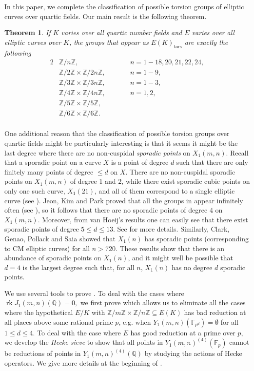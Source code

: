 \documentclass[11pt,reqno]{amsart}
\DeclareMathOperator{\rk}{rk}
\newtheorem{theorem}{Theorem}[section]
\theoremstyle{definition}
\numberwithin{equation}{section}
\newcommand{\Q}{\mathbb{Q}}
\newcommand{\F}{\mathbb{F}}
\newcommand{\tor}{\mathrm{tors}}
\def\torz#1{\mathbb Z /#1 \mathbb Z}
\def\tg#1#2{\mathbb Z/#1\mathbb Z \times \mathbb Z /#2 \mathbb Z}
\begin{document}
In this paper, we complete the classification of possible torsion groups of elliptic curves over quartic fields. Our main result is the following theorem.
\begin{theorem}\label{main_theorem}
 If $K$ varies over all quartic number fields and $E$ varies over
all elliptic curves over $K$, the groups that appear as
$E(K)_{\tor}$ are exactly the following
\begin{alignat*}{2}
& \torz{n},  && n=1-18, 20,21,22,24, \\
& \tg{2}{2n}, \quad \quad && n=1-9, \\
& \tg{3}{3n}, \quad && n=1-3, \\
& \tg{4}{4n}, \quad && n=1,2, \\
& \tg{5}{5}, \quad && \\
& \tg{6}{6}. \quad && \\
\end{alignat*}
\end{theorem}
One additional reason that the classification of possible torsion groups over quartic fields might be particularly interesting is that it seems it might be the last degree where there are no non-cuspidal \textit{sporadic points} on $X_1(m,n)$. Recall that a sporadic point on a curve $X$ is a point of degree $d$ such that there are only finitely many points of degree $\leq d$ on $X$. There are no non-cuspidal sporadic points on $X_1(m,n)$ of degree $1$ and $2$, while there exist sporadic cubic points on only one such curve, $X_1(21)$, and all of them correspond to a single elliptic curve (see \cite{najman16}). Jeon, Kim and Park \cite{JeonKimPark06} proved that all the groups in  appear infinitely often (see ), so it follows that there are no sporadic points of degree $4$ on $X_1(m,n)$. Moreover, from van Hoeij's results \cite{vanHoeij} one can easily see that there exist sporadic points of degree $5\leq d\leq 13$. See  for more details. Similarly, Clark, Genao, Pollack and Saia \cite{CGPS22} showed that $X_1(n)$ has sporadic points (corresponding to CM elliptic curves) for all $n>720$. These results show that there is an abundance of sporadic points on $X_1(n)$, and it might well be possible that $d=4$ is the largest degree such that, for all $n$, $X_1(n)$ has no degree $d$ sporadic points.

We use several tools to prove . To deal with the cases where $\rk J_1(m,n)(\Q)=0,$ we first prove  which allows us to eliminate all the cases where the hypothetical $E/K$ with $\tg{m}{n}\subseteq E(K)$ has bad reduction at all places above some rational prime $p$, e.g. when $Y_1(m,n)(\F_{p^d})= \emptyset$ for all $1\leq d\leq 4.$ To deal with the case where $E$ has good reduction at a prime over $p$, we develop the \textit{Hecke sieve} to show that all points in $Y_1(m,n)^{(4)}(\F_{p})$ cannot be reductions of points in $Y_1(m,n)^{(4)}(\Q)$ by studying the actions of Hecke operators. We give more details at the beginning of . 
\end{document}
